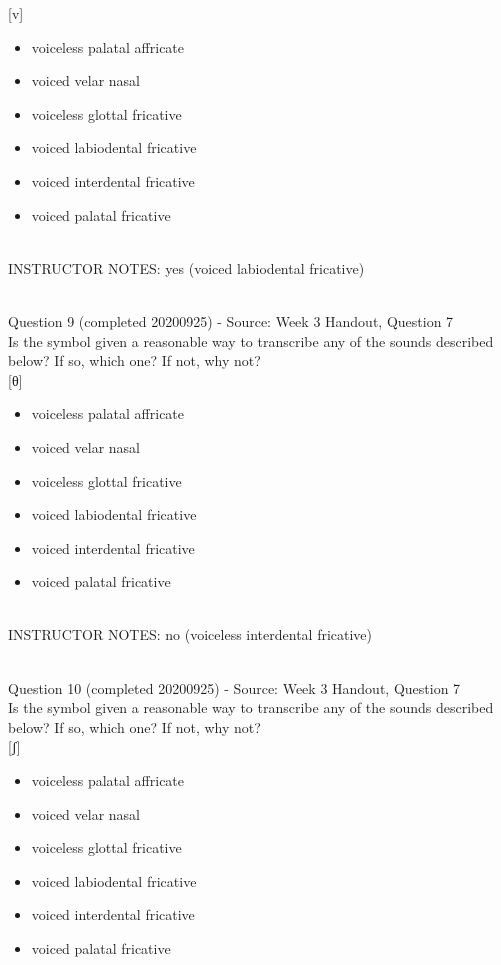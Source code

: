 \documentclass[12pt]{article}
\begin{document}
{[v]}

\begin{itemize} \item voiceless palatal affricate \item voiced velar nasal \item voiceless glottal fricative \item voiced labiodental fricative \item voiced interdental fricative \item voiced palatal fricative \end{itemize}


~\\
INSTRUCTOR NOTES: yes (voiced labiodental fricative)


~\\

{\large Question 9} (completed 20200925) - Source: Week 3 Handout, Question 7\\

Is the symbol given a reasonable way to transcribe any of the sounds described below? If so, which one? If not, why not?\\

{[θ]}

\begin{itemize} \item voiceless palatal affricate \item voiced velar nasal \item voiceless glottal fricative \item voiced labiodental fricative \item voiced interdental fricative \item voiced palatal fricative \end{itemize}


~\\
INSTRUCTOR NOTES: no (voiceless interdental fricative)


~\\

{\large Question 10} (completed 20200925) - Source: Week 3 Handout, Question 7\\

Is the symbol given a reasonable way to transcribe any of the sounds described below? If so, which one? If not, why not?\\

{[ʃ]}

\begin{itemize} \item voiceless palatal affricate \item voiced velar nasal \item voiceless glottal fricative \item voiced labiodental fricative \item voiced interdental fricative \item voiced palatal fricative \end{itemize}
\end{document}
